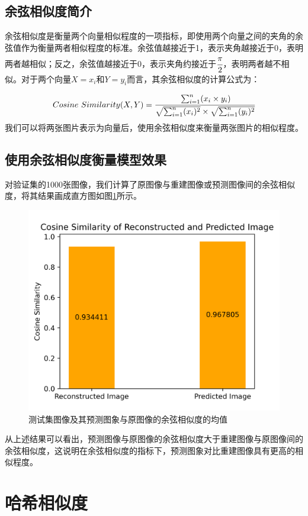 \subsection{余弦相似度简介}

余弦相似度是衡量两个向量相似程度的一项指标，即使用两个向量之间的夹角的余弦值作为衡量两者相似程度的标准。余弦值越接近于1，表示夹角越接近于0，表明两者越相似；反之，余弦值越接近于0，表示夹角约接近于$\cfrac{\pi}{2} $，表明两者越不相似。对于两个向量$X={x_i}$和$Y={y_i}$而言，其余弦相似度的计算公式为：

\begin{equation}\label{609}
	Cosine\ Similarity(X,Y)=\cfrac{\sum_{i=1}^n(x_i\times y_i)}{\sqrt{\sum_{i=1}^n(x_i)^2}\times \sqrt{\sum_{i=1}^n(y_i)^2}}
\end{equation}
我们可以将两张图片表示为向量后，使用余弦相似度来衡量两张图片的相似程度。

\subsection{使用余弦相似度衡量模型效果}
对验证集的1000张图像，我们计算了原图像与重建图像或预测图像间的余弦相似度，将其结果画成直方图如图\ref{fig607}所示。

\begin{figure}[h]
	\centering
	\includegraphics[width=0.75\columnwidth]{image/chap06/img607.png}
	\caption{测试集图像及其预测图象与原图像的余弦相似度的均值}
	\label{fig607}
\end{figure}

从上述结果可以看出，预测图像与原图像的余弦相似度大于重建图像与原图像间的余弦相似度，这说明在余弦相似度的指标下，预测图象对比重建图像具有更高的相似程度。

\section{哈希相似度}

